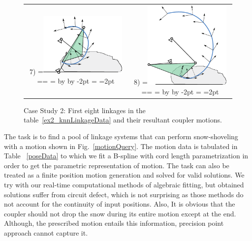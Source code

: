 \documentclass[twocolumn,10pt]{asme2ej}
\makeatletter
\newcommand{\putindeepbox}[2][0.7\baselineskip]{{%
    \setbox0=\hbox{#2}%
    \setbox0=\vbox{\noindent\hsize=\wd0\unhbox0}
    \@tempdima=\dp0
    \advance\@tempdima by \ht0
    \advance\@tempdima by -#1\relax
    \dp0=\@tempdima
    \ht0=#1\relax
    \box0
}}
\makeatother
\begin{document}
\begin{figure}
\begin{tabular}{cc}
  7)\putindeepbox[2pt]{\includegraphics[width=120pt]{figure/sol8.eps}}
    & 8)\putindeepbox[2pt]{\includegraphics[width=120pt]{figure/sol9.eps}}\\
\end{tabular}
\caption{Case Study 2: First eight linkages in the table~\ref{ex2_knnLinkageData} and their resultant coupler motions.}
\label{ex2_solns}
\end{figure}

The task is to find a pool of linkage systems that can perform snow-shoveling with a motion shown in Fig.~\ref{motionQuery}.
The motion data is tabulated in Table ~\ref{poseData} to which we fit a B-spline with cord length parametrization in order to get the parametric representation of motion.
The task can also be treated as a finite position motion generation and solved for valid solutions.
We try with our real-time computational methods of algebraic fitting\cite{generalfitting-JCISE},\cite{shrinathpurwar2017} but obtained solutions suffer from circuit defect, which is not surprising as those methods do not account for the continuity of input positions.
Also, It is obvious that the coupler should not drop the snow during its entire motion except at the end.
Although, the prescribed motion entails this information, precision point approach cannot capture it.
\end{document}
